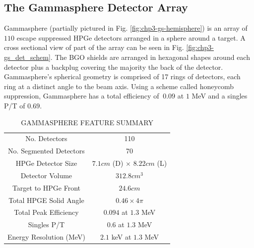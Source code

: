 \subsection{The Gammasphere Detector Array}
\label{ssec:exp-pr-gamma-gammasphere}
Gammasphere (partially pictured in Fig. \ref{fig:chp3-gs-hemisphere}) is an array of $110$ escape suppressed HPGe detectors arranged in a sphere around a target. A cross sectional view of part of the array can be seen in Fig. \ref{fig:chp3-gs_det_schem}. The BGO shields are arranged in hexagonal shapes around each detector plus a backplug covering the majority the back of the detector. Gammasphere's spherical geometry is comprised of 17 rings of detectors, each ring at a distinct angle to the beam axis. Using a scheme called honeycomb suppression, Gammasphere has a total efficiency of $~0.09$ at $1$ MeV and a singles P/T of $0.69$.


\begin{table}[hb!]
\caption{GAMMASPHERE FEATURE SUMMARY\label{tbl:gs-summary}}
\begin{center}
\begin{tabular}{|c|c|}
\toprule
No. Detectors             & 110 \\ 
No. Segmented Detectors   & 70 \\ 
HPGe Detector Size        & $7.1 cm$ (D) $\times$ $8.22 cm$ (L) \\
Detector Volume           & $312.8 cm^3$\\
Target to HPGe Front      & $24.6 cm$\\ 
Total HPGE Solid Angle    & $0.46 \times 4\pi$\\ 
Total Peak Efficiency     & $0.094$ at $1.3$ MeV\\ 
Singles P/T               & $0.6$ at $1.3$ MeV\\ 
Energy Resolution (MeV)   & $2.1$ keV at $1.3$ MeV \\ 
\bottomrule
\end{tabular}
\end{center}
\end{table}


